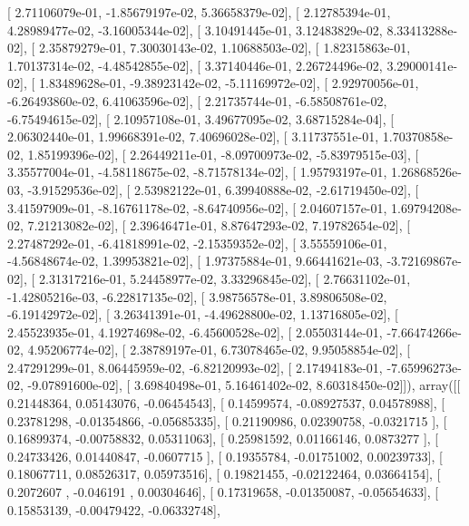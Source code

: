 \documentclass{article}
\begin{document}
       [  2.71106079e-01,  -1.85679197e-02,   5.36658379e-02],
       [  2.12785394e-01,   4.28989477e-02,  -3.16005344e-02],
       [  3.10491445e-01,   3.12483829e-02,   8.33413288e-02],
       [  2.35879279e-01,   7.30030143e-02,   1.10688503e-02],
       [  1.82315863e-01,   1.70137314e-02,  -4.48542855e-02],
       [  3.37140446e-01,   2.26724496e-02,   3.29000141e-02],
       [  1.83489628e-01,  -9.38923142e-02,  -5.11169972e-02],
       [  2.92970056e-01,  -6.26493860e-02,   6.41063596e-02],
       [  2.21735744e-01,  -6.58508761e-02,  -6.75494615e-02],
       [  2.10957108e-01,   3.49677095e-02,   3.68715284e-04],
       [  2.06302440e-01,   1.99668391e-02,   7.40696028e-02],
       [  3.11737551e-01,   1.70370858e-02,   1.85199396e-02],
       [  2.26449211e-01,  -8.09700973e-02,  -5.83979515e-03],
       [  3.35577004e-01,  -4.58118675e-02,  -8.71578134e-02],
       [  1.95793197e-01,   1.26868526e-03,  -3.91529536e-02],
       [  2.53982122e-01,   6.39940888e-02,  -2.61719450e-02],
       [  3.41597909e-01,  -8.16761178e-02,  -8.64740956e-02],
       [  2.04607157e-01,   1.69794208e-02,   7.21213082e-02],
       [  2.39646471e-01,   8.87647293e-02,   7.19782654e-02],
       [  2.27487292e-01,  -6.41818991e-02,  -2.15359352e-02],
       [  3.55559106e-01,  -4.56848674e-02,   1.39953821e-02],
       [  1.97375884e-01,   9.66441621e-03,  -3.72169867e-02],
       [  2.31317216e-01,   5.24458977e-02,   3.33296845e-02],
       [  2.76631102e-01,  -1.42805216e-03,  -6.22817135e-02],
       [  3.98756578e-01,   3.89806508e-02,  -6.19142972e-02],
       [  3.26341391e-01,  -4.49628800e-02,   1.13716805e-02],
       [  2.45523935e-01,   4.19274698e-02,  -6.45600528e-02],
       [  2.05503144e-01,  -7.66474266e-02,   4.95206774e-02],
       [  2.38789197e-01,   6.73078465e-02,   9.95058854e-02],
       [  2.47291299e-01,   8.06445959e-02,  -6.82120993e-02],
       [  2.17494183e-01,  -7.65996273e-02,  -9.07891600e-02],
       [  3.69840498e-01,   5.16461402e-02,   8.60318450e-02]]), array([[ 0.21448364,  0.05143076, -0.06454543],
       [ 0.14599574, -0.08927537,  0.04578988],
       [ 0.23781298, -0.01354866, -0.05685335],
       [ 0.21190986,  0.02390758, -0.0321715 ],
       [ 0.16899374, -0.00758832,  0.05311063],
       [ 0.25981592,  0.01166146,  0.0873277 ],
       [ 0.24733426,  0.01440847, -0.0607715 ],
       [ 0.19355784, -0.01751002,  0.00239733],
       [ 0.18067711,  0.08526317,  0.05973516],
       [ 0.19821455, -0.02122464,  0.03664154],
       [ 0.2072607 , -0.046191  ,  0.00304646],
       [ 0.17319658, -0.01350087, -0.05654633],
       [ 0.15853139, -0.00479422, -0.06332748],
\end{document}
